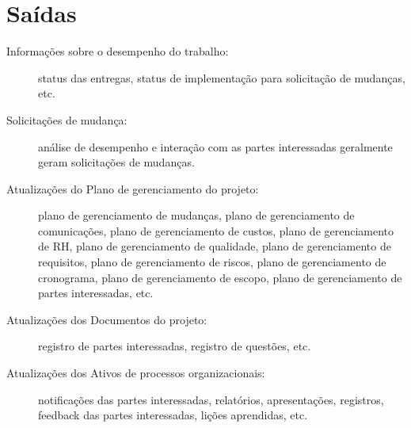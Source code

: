 \section{Saídas}

\begin{description}
	
	\item[Informações sobre o desempenho do trabalho:] status das entregas, status de implementação para solicitação de mudanças, etc.
	
	\item[Solicitações de mudança:] análise de desempenho e interação com as partes interessadas geralmente geram solicitações de mudanças.
	
	\item[Atualizações do Plano de gerenciamento do projeto:] plano de gerenciamento de mudanças, plano de gerenciamento de comunicações, plano de gerenciamento de custos, plano de gerenciamento de RH, plano de gerenciamento de qualidade, plano de gerenciamento de requisitos, plano de gerenciamento de riscos, plano de gerenciamento de cronograma, plano de gerenciamento de escopo, plano de gerenciamento de partes interessadas, etc.
	
	\item[Atualizações dos Documentos do projeto:] registro de partes interessadas, registro de questões, etc.
	
	\item[Atualizações dos Ativos de processos organizacionais:] notificações das partes interessadas, relatórios, apresentações, registros, feedback das partes interessadas, lições aprendidas, etc.
	
\end{description}